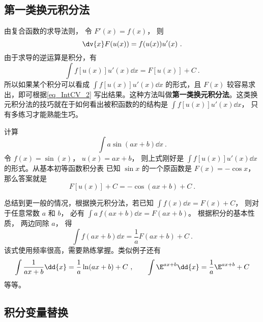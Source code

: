 
\subsection{第一类换元积分法}
由复合函数的求导法则， 令 $F'(x) = f(x)$， 则
\begin{equation}
\dv{x} F(u(x)) = f(u(x))u'(x)~.
\end{equation}
由于求导的逆运算是积分，有
\begin{equation}\label{eq_IntCV_2}
\int f[u(x)]u'(x) \dd{x}  = F[u(x)] + C~.
\end{equation}
所以如果某个积分可以看成 $\int f[u(x)]u'(x) \dd{x}$ 的形式，且 $F(x)$ 较容易求出，即可根据\autoref{eq_IntCV_2} 写出结果。这种方法叫做\textbf{第一类换元积分法}。这类换元积分法的技巧就在于如何看出被积函数的的结构是 $\int f[u(x)]u'(x) \dd{x}$， 只有多练习才能熟能生巧。 

\begin{example}{}
计算
\begin{equation}
\int a\sin(ax + b) \dd{x}~.
\end{equation}
令 $f(x) = \sin(x)$， $u(x) = ax + b$， 则上式刚好是 $\int f[u(x)]u'(x) \dd{x}$ 的形式。从基本初等函数积分表 %
已知 $\sin x$ 的一个原函数是 $F(x) = -\cos x$， 那么答案就是
\begin{equation}
F[u(x)] + C =  - \cos(ax + b) + C~.
\end{equation}
\end{example}

总结到更一般的情况，根据换元积分法，若已知 $\int f(x) \dd{x}  = F(x) + C$， 则对于任意常数 $a$ 和 $b$， 必有 $\int a \,f(ax + b) \dd{x} = F(ax + b)$。 根据积分的基本性质，%
两边同除 $a$， 得
\begin{equation}\label{eq_IntCV_5}
\int f(ax + b) \dd{x} = \frac{1}{a} F(ax + b) + C~.
\end{equation}
该式使用频率很高，需要熟练掌握。类似例子还有
\begin{equation}
\int \frac{1}{ax+b} \dd{x} = \frac{1}{a}\ln (ax + b)+C ~, \qquad
\int \E^{ax + b} \dd{x} = \frac{1}{a} \E^{ax + b}+C
\end{equation}
等等。

\subsection{积分变量替换}

